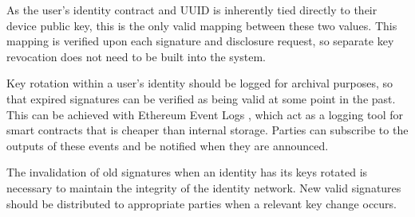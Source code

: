 As the user's identity contract and \ac{UUID} is inherently tied directly to their device public key, this is the only valid mapping between these two values. This mapping is verified upon each signature and disclosure request, so separate key revocation does not need to be built into the system.

Key rotation within a user's identity should be logged for archival purposes, so that expired signatures can be verified as being valid at some point in the past. This can be achieved with Ethereum Event Logs \cite{chow_technical_2016}, which act as a logging tool for smart contracts that is cheaper than internal storage. Parties can subscribe to the outputs of these events and be notified when they are announced.

The invalidation of old signatures when an identity has its keys rotated is necessary to maintain the integrity of the identity network. New valid signatures should be distributed to appropriate parties when a relevant key change occurs.